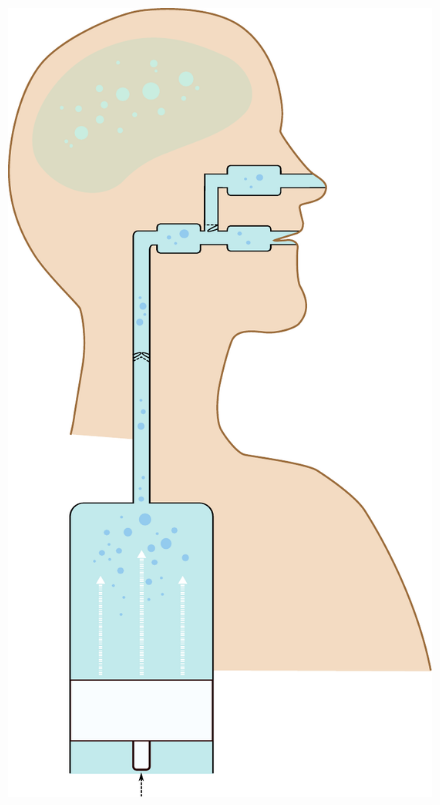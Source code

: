 \documentclass[12pt]{report}
\begin{document}
\begin{figure}[ht]
\begin{changemargin}{0cm}{0cm}
{                \includegraphics[width=0.28\paperwidth,valign=t]{tubes}%
}
\end{changemargin}
\end{figure}
\end{document}
